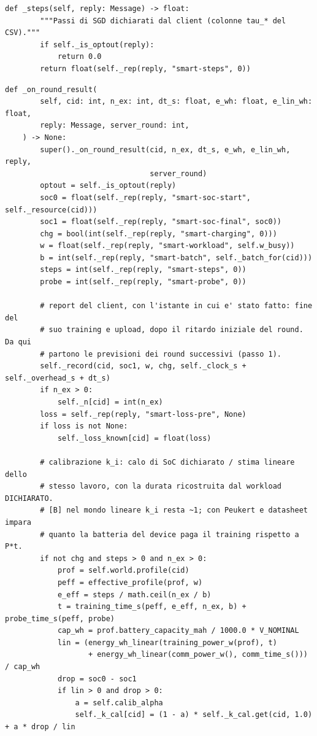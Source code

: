 \documentclass[11pt,a4paper]{article}
\begin{document}
\begin{lstlisting}[style=py,firstnumber=777,caption={\texttt{tesifl/strategies/sage\_smart.py}, lines 777--842}]
    def _steps(self, reply: Message) -> float:
        """Passi di SGD dichiarati dal client (colonne tau_* del CSV)."""
        if self._is_optout(reply):
            return 0.0
        return float(self._rep(reply, "smart-steps", 0))
\end{lstlisting}

\begin{lstlisting}[style=py,firstnumber=844,caption={\texttt{tesifl/strategies/sage\_smart.py}, lines 844--906}]
    def _on_round_result(
        self, cid: int, n_ex: int, dt_s: float, e_wh: float, e_lin_wh: float,
        reply: Message, server_round: int,
    ) -> None:
        super()._on_round_result(cid, n_ex, dt_s, e_wh, e_lin_wh, reply,
                                 server_round)
        optout = self._is_optout(reply)
        soc0 = float(self._rep(reply, "smart-soc-start", self._resource(cid)))
        soc1 = float(self._rep(reply, "smart-soc-final", soc0))
        chg = bool(int(self._rep(reply, "smart-charging", 0)))
        w = float(self._rep(reply, "smart-workload", self.w_busy))
        b = int(self._rep(reply, "smart-batch", self._batch_for(cid)))
        steps = int(self._rep(reply, "smart-steps", 0))
        probe = int(self._rep(reply, "smart-probe", 0))

        # report del client, con l'istante in cui e' stato fatto: fine del
        # suo training e upload, dopo il ritardo iniziale del round. Da qui
        # partono le previsioni dei round successivi (passo 1).
        self._record(cid, soc1, w, chg, self._clock_s + self._overhead_s + dt_s)
        if n_ex > 0:
            self._n[cid] = int(n_ex)
        loss = self._rep(reply, "smart-loss-pre", None)
        if loss is not None:
            self._loss_known[cid] = float(loss)

        # calibrazione k_i: calo di SoC dichiarato / stima lineare dello
        # stesso lavoro, con la durata ricostruita dal workload DICHIARATO.
        # [B] nel mondo lineare k_i resta ~1; con Peukert e datasheet impara
        # quanto la batteria del device paga il training rispetto a P*t.
        if not chg and steps > 0 and n_ex > 0:
            prof = self.world.profile(cid)
            peff = effective_profile(prof, w)
            e_eff = steps / math.ceil(n_ex / b)
            t = training_time_s(peff, e_eff, n_ex, b) + probe_time_s(peff, probe)
            cap_wh = prof.battery_capacity_mah / 1000.0 * V_NOMINAL
            lin = (energy_wh_linear(training_power_w(prof), t)
                   + energy_wh_linear(comm_power_w(), comm_time_s())) / cap_wh
            drop = soc0 - soc1
            if lin > 0 and drop > 0:
                a = self.calib_alpha
                self._k_cal[cid] = (1 - a) * self._k_cal.get(cid, 1.0) + a * drop / lin


\end{lstlisting}
\end{document}
